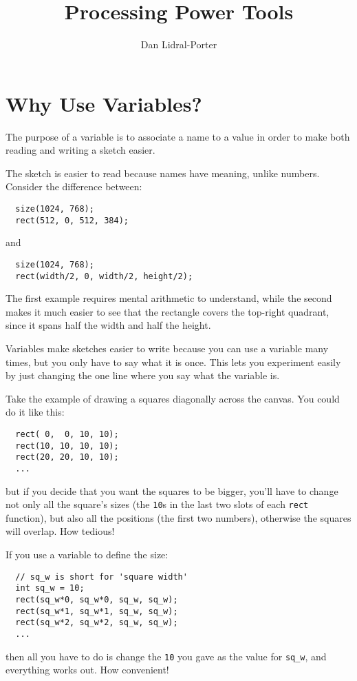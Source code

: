 \documentclass[
]{leaflet}
\title{Processing Power Tools\vspace{-2ex}}
\author{%
  Dan Lidral-Porter\vspace{-2ex}
}
\date{}
\begin{document}


\maketitle
\thispagestyle{empty}


\section{Why Use Variables?}

The purpose of a variable is to associate a name to a value in order to make both reading and writing a sketch easier.

The sketch is easier to read because names have meaning, unlike numbers.
Consider the difference between:
\begin{lstlisting}
  size(1024, 768);
  rect(512, 0, 512, 384);
\end{lstlisting}
\vspace{-0.5em}
and
\begin{lstlisting}
  size(1024, 768);
  rect(width/2, 0, width/2, height/2);
\end{lstlisting}
The first example requires mental arithmetic to understand, while the second makes it much easier to see that the rectangle covers the top-right quadrant, since it spans half the width and half the height.

Variables make sketches easier to write because you can use a variable many times, but you only have to say what it is once.
This lets you experiment easily by just changing the one line where you say what the variable is.

Take the example of drawing a squares diagonally across the canvas.
You could do it like this:
\begin{lstlisting}
  rect( 0,  0, 10, 10);
  rect(10, 10, 10, 10);
  rect(20, 20, 10, 10);
  ...
\end{lstlisting}
but if you decide that you want the squares to be bigger, you'll have to change not only all the square's sizes (the \texttt{10}s in the last two slots of each \texttt{rect} function), but also all the positions (the first two numbers), otherwise the squares will overlap.
How tedious!

If you use a variable to define the size:
\begin{lstlisting}
  // sq_w is short for 'square width'
  int sq_w = 10;
  rect(sq_w*0, sq_w*0, sq_w, sq_w);
  rect(sq_w*1, sq_w*1, sq_w, sq_w);
  rect(sq_w*2, sq_w*2, sq_w, sq_w);
  ...
\end{lstlisting}
then all you have to do is change the \texttt{10} you gave as the value for \texttt{sq\_w}, and everything works out.
How convenient!
\vspace{-1.5em}
\end{document}
